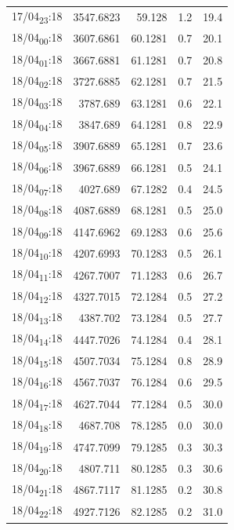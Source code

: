 \documentclass[11pt]{article}
\begin{document}
\begin{center}
\begin{tabular}{lrrrr}
17/04\textsubscript{23}:18 & 3547.6823 & 59.128 & 1.2 & 19.4\\[0pt]
18/04\textsubscript{00}:18 & 3607.6861 & 60.1281 & 0.7 & 20.1\\[0pt]
18/04\textsubscript{01}:18 & 3667.6881 & 61.1281 & 0.7 & 20.8\\[0pt]
18/04\textsubscript{02}:18 & 3727.6885 & 62.1281 & 0.7 & 21.5\\[0pt]
18/04\textsubscript{03}:18 & 3787.689 & 63.1281 & 0.6 & 22.1\\[0pt]
18/04\textsubscript{04}:18 & 3847.689 & 64.1281 & 0.8 & 22.9\\[0pt]
18/04\textsubscript{05}:18 & 3907.6889 & 65.1281 & 0.7 & 23.6\\[0pt]
18/04\textsubscript{06}:18 & 3967.6889 & 66.1281 & 0.5 & 24.1\\[0pt]
18/04\textsubscript{07}:18 & 4027.689 & 67.1282 & 0.4 & 24.5\\[0pt]
18/04\textsubscript{08}:18 & 4087.6889 & 68.1281 & 0.5 & 25.0\\[0pt]
18/04\textsubscript{09}:18 & 4147.6962 & 69.1283 & 0.6 & 25.6\\[0pt]
18/04\textsubscript{10}:18 & 4207.6993 & 70.1283 & 0.5 & 26.1\\[0pt]
18/04\textsubscript{11}:18 & 4267.7007 & 71.1283 & 0.6 & 26.7\\[0pt]
18/04\textsubscript{12}:18 & 4327.7015 & 72.1284 & 0.5 & 27.2\\[0pt]
18/04\textsubscript{13}:18 & 4387.702 & 73.1284 & 0.5 & 27.7\\[0pt]
18/04\textsubscript{14}:18 & 4447.7026 & 74.1284 & 0.4 & 28.1\\[0pt]
18/04\textsubscript{15}:18 & 4507.7034 & 75.1284 & 0.8 & 28.9\\[0pt]
18/04\textsubscript{16}:18 & 4567.7037 & 76.1284 & 0.6 & 29.5\\[0pt]
18/04\textsubscript{17}:18 & 4627.7044 & 77.1284 & 0.5 & 30.0\\[0pt]
18/04\textsubscript{18}:18 & 4687.708 & 78.1285 & 0.0 & 30.0\\[0pt]
18/04\textsubscript{19}:18 & 4747.7099 & 79.1285 & 0.3 & 30.3\\[0pt]
18/04\textsubscript{20}:18 & 4807.711 & 80.1285 & 0.3 & 30.6\\[0pt]
18/04\textsubscript{21}:18 & 4867.7117 & 81.1285 & 0.2 & 30.8\\[0pt]
18/04\textsubscript{22}:18 & 4927.7126 & 82.1285 & 0.2 & 31.0\\[0pt]

\end{tabular}
\end{center}
\end{document}
